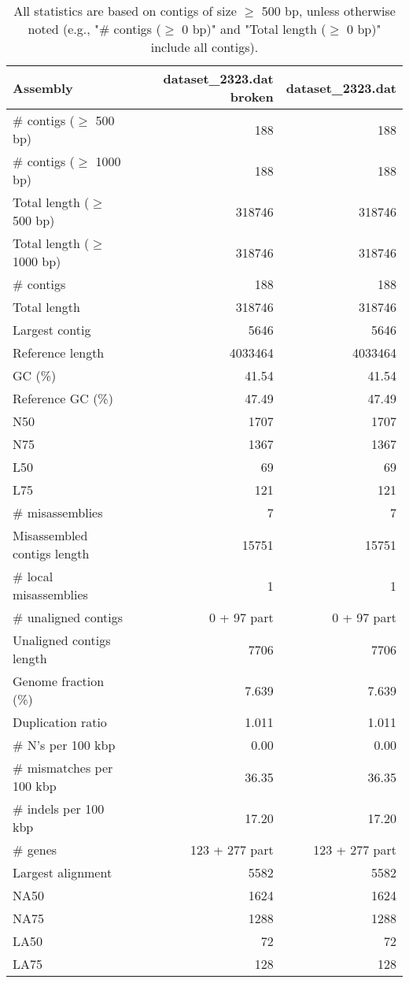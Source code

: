 \documentclass[12pt,a4paper]{article}
\begin{document}
\begin{table}[ht]
\begin{center}
\caption{All statistics are based on contigs of size $\geq$ 500 bp, unless otherwise noted (e.g., "\# contigs ($\geq$ 0 bp)" and "Total length ($\geq$ 0 bp)" include all contigs).}
\begin{tabular}{|l*{2}{|r}|}
\hline
Assembly & dataset\_2323.dat broken & dataset\_2323.dat \\ \hline
\# contigs ($\geq$ 500 bp) & 188 & 188 \\ \hline
\# contigs ($\geq$ 1000 bp) & 188 & 188 \\ \hline
Total length ($\geq$ 500 bp) & 318746 & 318746 \\ \hline
Total length ($\geq$ 1000 bp) & 318746 & 318746 \\ \hline
\# contigs & 188 & 188 \\ \hline
Total length & 318746 & 318746 \\ \hline
Largest contig & 5646 & 5646 \\ \hline
Reference length & 4033464 & 4033464 \\ \hline
GC (\%) & 41.54 & 41.54 \\ \hline
Reference GC (\%) & 47.49 & 47.49 \\ \hline
N50 & 1707 & 1707 \\ \hline
N75 & 1367 & 1367 \\ \hline
L50 & 69 & 69 \\ \hline
L75 & 121 & 121 \\ \hline
\# misassemblies & 7 & 7 \\ \hline
Misassembled contigs length & 15751 & 15751 \\ \hline
\# local misassemblies & 1 & 1 \\ \hline
\# unaligned contigs & 0 + 97 part & 0 + 97 part \\ \hline
Unaligned contigs length & 7706 & 7706 \\ \hline
Genome fraction (\%) & 7.639 & 7.639 \\ \hline
Duplication ratio & 1.011 & 1.011 \\ \hline
\# N's per 100 kbp & 0.00 & 0.00 \\ \hline
\# mismatches per 100 kbp & 36.35 & 36.35 \\ \hline
\# indels per 100 kbp & 17.20 & 17.20 \\ \hline
\# genes & 123 + 277 part & 123 + 277 part \\ \hline
Largest alignment & 5582 & 5582 \\ \hline
NA50 & 1624 & 1624 \\ \hline
NA75 & 1288 & 1288 \\ \hline
LA50 & 72 & 72 \\ \hline
LA75 & 128 & 128 \\ \hline
\end{tabular}
\end{center}
\end{table}
\end{document}
